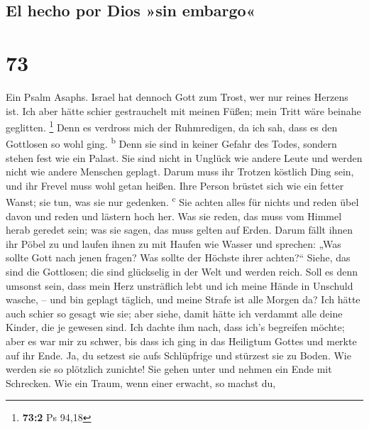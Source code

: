 \hypertarget{el-hecho-por-dios-sin-embargo}{%
\subsection{El hecho por Dios »sin
embargo«}\label{el-hecho-por-dios-sin-embargo}}

\hypertarget{section-72}{%
\section{73}\label{section-72}}

 Ein Psalm Asaphs. Israel hat dennoch Gott zum Trost, wer
nur reines Herzens ist.  Ich aber hätte schier
gestrauchelt mit meinen Füßen; mein Tritt wäre beinahe geglitten.
\footnote{\textbf{73:2} Ps 94,18}  Denn es verdross mich
der Ruhmredigen, da ich sah, dass es den Gottlosen so wohl ging.
\textsuperscript{b}  Denn sie sind in keiner Gefahr des
Todes, sondern stehen fest wie ein Palast.  Sie sind nicht
in Unglück wie andere Leute und werden nicht wie andere Menschen
geplagt.  Darum muss ihr Trotzen köstlich Ding sein, und
ihr Frevel muss wohl getan heißen.  Ihre Person brüstet
sich wie ein fetter Wanst; sie tun, was sie nur gedenken.
\textsuperscript{c}  Sie achten alles für nichts und reden
übel davon und reden und lästern hoch her.  Was sie reden,
das muss vom Himmel herab geredet sein; was sie sagen, das muss gelten
auf Erden.  Darum fällt ihnen ihr Pöbel zu und laufen
ihnen zu mit Haufen wie Wasser  und sprechen: „Was sollte
Gott nach jenen fragen? Was sollte der Höchste ihrer achten?{}``
 Siehe, das sind die Gottlosen; die sind glückselig in
der Welt und werden reich.  Soll es denn umsonst sein,
dass mein Herz unsträflich lebt und ich meine Hände in Unschuld wasche,
--  und bin geplagt täglich, und meine Strafe ist alle
Morgen da?  Ich hätte auch schier so gesagt wie sie; aber
siehe, damit hätte ich verdammt alle deine Kinder, die je gewesen sind.
 Ich dachte ihm nach, dass ich's begreifen möchte; aber
es war mir zu schwer,  bis dass ich ging in das Heiligtum
Gottes und merkte auf ihr Ende.  Ja, du setzest sie aufs
Schlüpfrige und stürzest sie zu Boden.  Wie werden sie so
plötzlich zunichte! Sie gehen unter und nehmen ein Ende mit Schrecken.
 Wie ein Traum, wenn einer erwacht, so machst du,
